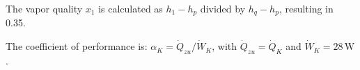 The vapor quality \( x_1 \) is calculated as \( h_1 - h_p \) divided by \( h_q - h_p \), resulting in 0.35.  

The coefficient of performance is:  
\( \alpha_K = \dot{Q}_{zu} / \dot{W}_K \), with \( \dot{Q}_{zu} = \dot{Q}_K \) and \( \dot{W}_K = 28 \, \text{W} \).